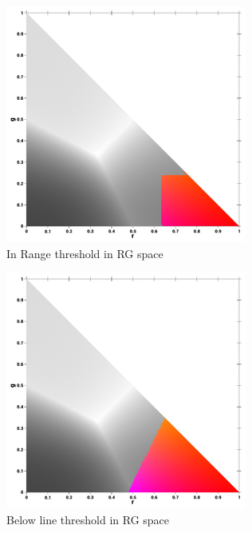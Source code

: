 \begin{multicols}{2}
	\begin{figure}[H]
		\centering
		\includegraphics[width=1\linewidth]{figure/Analysis/inrangethresholdcolor.png}
		\caption{In Range threshold in RG space}
		\label{thresholdintrange}
	\end{figure}
	\columnbreak
	\begin{figure}[H]
		\centering
		\includegraphics[width=1\linewidth]{figure/Analysis/belowlinethresholdthresholdcolor.png}
		\caption{Below line threshold in RG space}
		\label{fig:thresholdbelowline}
	\end{figure}
	
\end{multicols}

